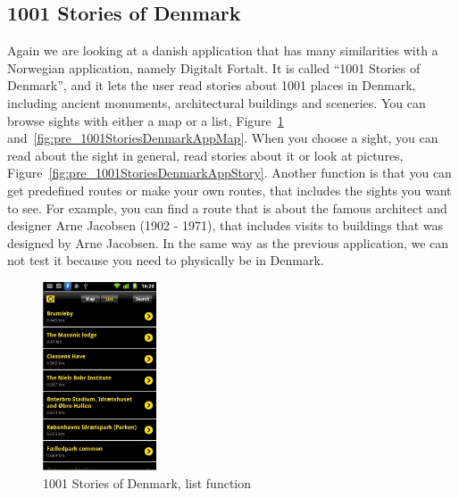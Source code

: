 \documentclass[11pt]{book}
\begin{document}
\subsection{1001 Stories of Denmark}
Again we are looking at a danish application that has many similarities with a Norwegian application, namely Digitalt Fortalt. It is called ``1001 Stories of Denmark'', and it lets the user read stories about 1001 places in Denmark, including ancient monuments, architectural buildings and sceneries. You can browse sights with either a map or a list, Figure~\ref{fig:pre_1001StoriesDenmarkAppList} and~\ref{fig:pre_1001StoriesDenmarkAppMap}. When you choose a sight, you can read about the sight in general, read stories about it or look at pictures, Figure~\ref{fig:pre_1001StoriesDenmarkAppStory}. Another function is that you can get predefined routes or make your own routes, that includes the sights you want to see. For example, you can find a route that is about the famous architect and designer Arne Jacobsen (1902 - 1971), that includes visits to buildings that was designed by Arne Jacobsen. In the same way as the previous application, we can not test it because you need to physically be in Denmark.

\begin{figure}[H]
      \centering
      \includegraphics[width=0.3\textwidth]{Figures/Prestudy/1001storiesList.png}
      \caption{1001 Stories of Denmark, list function}
      \label{fig:pre_1001StoriesDenmarkAppList}
\end{figure}
\end{document}
